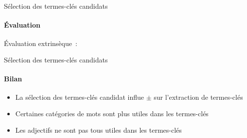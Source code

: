 \begin{frame}{Sélection des termes-clés candidats}\framesubtitle{Évaluation}
  Évaluation extrinsèque~:

  \begin{center}
  \end{center}
\end{frame}

\begin{frame}{Sélection des termes-clés candidats}\framesubtitle{Bilan}
  \begin{itemize}
    \item{La sélection des termes-clés candidat influe $\pm$ sur
          l'extraction de termes-clés}
    \item{Certaines catégories de mots sont plus utiles dans les
          termes-clés}
    \item{Les adjectifs ne sont pas tous utiles dans les termes-clés}
  \end{itemize}
\end{frame}

